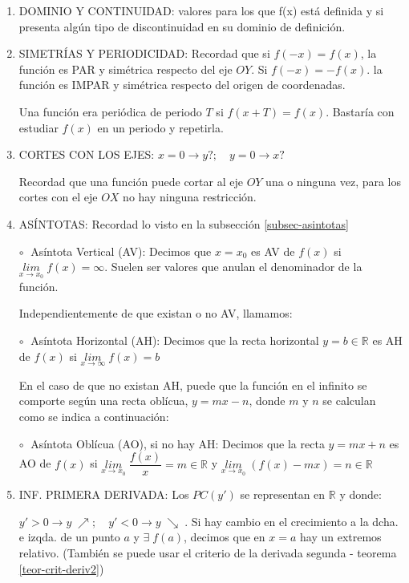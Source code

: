 	\begin{enumerate}
	\item DOMINIO Y CONTINUIDAD: valores para los que f(x) está definida y si presenta algún tipo de discontinuidad en su dominio de definición.
	\item SIMETRÍAS Y PERIODICIDAD: Recordad que si $f(-x)=f(x)$, la función es PAR y simétrica respecto del eje $OY$. Si  $f(-x)=-f(x)$. la función es IMPAR y simétrica respecto del origen de coordenadas.

	Una función era periódica de periodo $T$ si $f(x+T)=f(x)$. Bastaría con estudiar $f(x)$ en un periodo y repetirla.

	\item  CORTES CON LOS EJES:	 $x=0 \to y?; \quad y=0 \to x?$
	
	Recordad que una función puede cortar al eje $OY$ una o ninguna vez, para los cortes con el eje $OX$ no hay ninguna restricción.
	
	\item ASÍNTOTAS: Recordad lo visto en la subsección \ref{subsec-asintotas}
	
		\hspace{10mm} $\circ\;$ Asíntota Vertical (AV): Decimos que $x=x_0$ es AV de $f(x)$ si $\underset{x\to x_0}{lim}\;{f(x)}=\infty$. Suelen ser valores que anulan el denominador de la función.
		
		Independientemente de que existan o no AV, llamamos:
		
		\hspace{10mm} $\circ\;$ Asíntota Horizontal (AH): Decimos que la recta horizontal $y=b\in \mathbb R$ es AH de $f(x)$ si $\underset{x\to \infty}{lim}\;{f(x)}=b$
		
		En el caso de que no existan AH, puede que la función en el infinito se comporte según una recta oblícua, $y=mx-n$, donde $m$ y $n$ se calculan como se indica a continuación:
		
		\hspace{10mm} $\circ\;$ Asíntota Oblícua (AO), si no hay AH: Decimos que la recta $y=mx+n$ es AO de $f(x)$ si $\underset{x\to x_0}{lim}\;{\dfrac {f(x)} {x} }=m\in \mathbb R$ y $\underset{x\to x_0}{lim}\;{(f(x)-mx)}=n \in \mathbb R$
		
	\item INF. PRIMERA DERIVADA: Los $PC(y')$ se representan en $\mathbb R$ y donde:
	
	 $y'>0 \to y \; \nearrow; \quad y'<0 \to y \; \searrow \;$.  Si hay cambio en el crecimiento a la dcha. e izqda. de un punto $a$ y $\exists \; f(a)$, decimos que en $x=a$ hay un extremos relativo. (También se puede usar el criterio de la derivada segunda - teorema \ref{teor-crit-deriv2})
	 

\end{enumerate}
